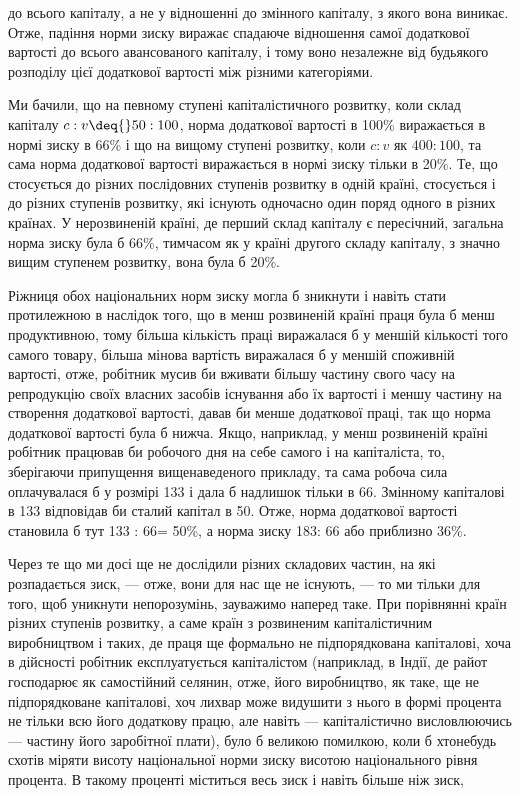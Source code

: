 \parcont{}  %
до всього капіталу, а не у відношенні до змінного капіталу, з
якого вона виникає. Отже, падіння норми зиску виражає спадаюче
відношення самої додаткової вартості до всього авансованого
капіталу, і тому воно незалежне від будьякого розподілу
цієї додаткової вартості між різними категоріями.

Ми бачили, що на певному ступені капіталістичного розвитку,
коли склад капіталу $c : v \deq{} 50 : 100$, норма додаткової вартості
в 100\% виражається в нормі зиску в 66\% і що на вищому
ступені розвитку, коли $c : v$ як $400 : 100$, та сама норма додаткової
вартості виражається в нормі зиску тільки в 20\%. Те, що
стосується до різних послідовних ступенів розвитку в одній
країні, стосується і до різних ступенів розвитку, які існують
одночасно один поряд одного в різних країнах. У нерозвиненій
країні, де перший склад капіталу є пересічний, загальна норма
зиску була б \deq{} 66\%, тимчасом як у країні другого складу капіталу,
з значно вищим ступенем розвитку, вона була б \deq{} 20\%.

Ріжниця обох національних норм зиску могла б зникнути і
навіть стати протилежною в наслідок того, що в менш розвиненій
країні праця була б менш продуктивною, тому більша
кількість праці виражалася б у меншій кількості того самого
товару, більша мінова вартість виражалася б у меншій споживній
вартості, отже, робітник мусив би вживати більшу частину
свого часу на репродукцію своїх власних засобів існування або
їх вартості і меншу частину на створення додаткової вартості,
давав би менше додаткової праці, так що норма додаткової
вартості була б нижча. Якщо, наприклад, у менш розвиненій країні
робітник працював би  робочого дня на себе самого і  на
капіталіста, то, зберігаючи припущення вищенаведеного прикладу,
та сама робоча сила оплачувалася б у розмірі 133 і дала б
надлишок тільки в 66. Змінному капіталові в 133 відповідав
би сталий капітал в 50. Отже, норма додаткової вартості становила
б тут 133 : 66= 50\%, а норма зиску 183:
66 або приблизно 36\%.

Через те що ми досі ще не дослідили різних складових частин,
на які розпадається зиск, — отже, вони для нас ще не існують,
— то ми тільки для того, щоб уникнути непорозумінь,
зауважимо наперед таке. При порівнянні країн різних ступенів
розвитку, а саме країн з розвиненим капіталістичним виробництвом
і таких, де праця ще формально не підпорядкована капіталові,
хоча в дійсності робітник експлуатується капіталістом
(наприклад, в Індії, де райот господарює як самостійний селянин,
отже, його виробництво, як таке, ще не підпорядковане капіталові,
хоч лихвар може видушити з нього в формі процента
не тільки всю його додаткову працю, але навіть — капіталістично
висловлюючись — частину його заробітної плати), було б
великою помилкою, коли б хтонебудь схотів міряти висоту національної
норми зиску висотою національного рівня процента.
В такому проценті міститься весь зиск і навіть більше ніж зиск,
\parbreak{}  %
